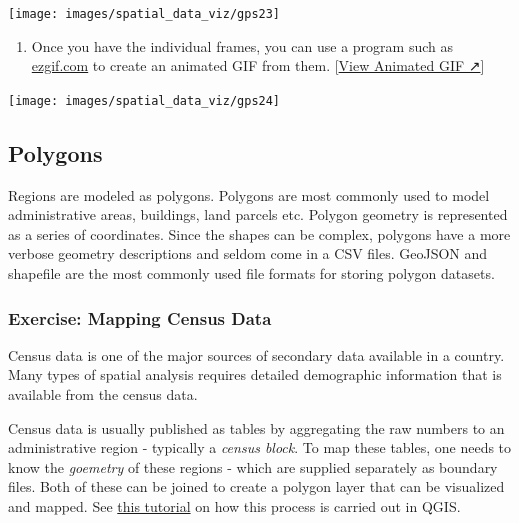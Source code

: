\documentclass[
  12pt,
  a4paper]{article}
\providecommand{\tightlist}{%
  \setlength{\itemsep}{0pt}\setlength{\parskip}{0pt}}
\begin{document}
\begin{center}\texttt{[image: images/spatial\_data\_viz/gps23]} \end{center}

\begin{enumerate}
\def\labelenumi{\arabic{enumi}.}
\setcounter{enumi}{23}
\tightlist
\item
  Once you have the individual frames, you can use a program such as
  \href{https://ezgif.com/}{ezgif.com} to create an animated GIF from
  them.
  {[}\href{https://courses.spatialthoughts.com/images/spatial_data_viz/gps_track_animation.gif}{View
  Animated GIF ↗}{]}
\end{enumerate}

\begin{center}\texttt{[image: images/spatial\_data\_viz/gps24]} \end{center}

\newpage

\hypertarget{polygons}{%
\subsection{Polygons}\label{polygons}}

Regions are modeled as polygons. Polygons are most commonly used to
model administrative areas, buildings, land parcels etc. Polygon
geometry is represented as a series of coordinates. Since the shapes can
be complex, polygons have a more verbose geometry descriptions and
seldom come in a CSV files. GeoJSON and shapefile are the most commonly
used file formats for storing polygon datasets.

\hypertarget{exercise-mapping-census-data}{%
\subsubsection{Exercise: Mapping Census
Data}\label{exercise-mapping-census-data}}

Census data is one of the major sources of secondary data available in a
country. Many types of spatial analysis requires detailed demographic
information that is available from the census data.

Census data is usually published as tables by aggregating the raw
numbers to an administrative region - typically a \emph{census block}.
To map these tables, one needs to know the \emph{goemetry} of these
regions - which are supplied separately as boundary files. Both of these
can be joined to create a polygon layer that can be visualized and
mapped. See
\href{https://www.qgistutorials.com/en/docs/3/performing_table_joins.html}{this
tutorial} on how this process is carried out in QGIS.
\end{document}
